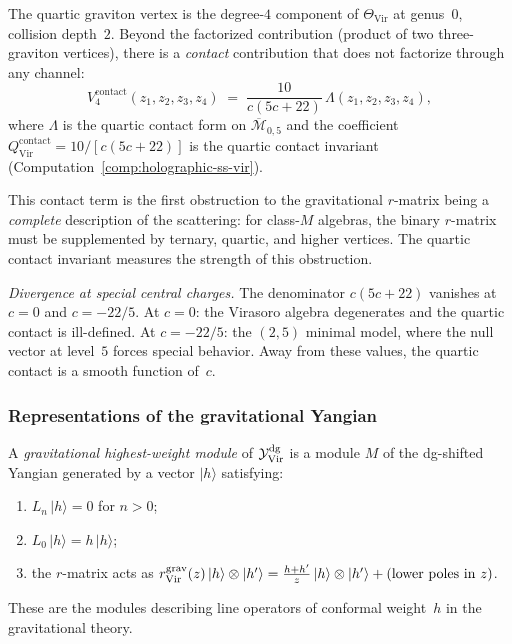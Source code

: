 \begin{computation}
\label{comp:thqg-V-quartic-graviton}
The quartic graviton vertex is the degree-$4$ component of
$\Theta_{\mathrm{Vir}}$ at genus~$0$, collision depth~$2$.
Beyond the factorized contribution
(product of two three-graviton vertices), there is a
\emph{contact} contribution that does not factorize through
any channel:
\begin{equation}\label{eq:thqg-V-quartic-contact}
V_4^{\mathrm{contact}}(z_1, z_2, z_3, z_4)
\;=\;
\frac{10}{c(5c+22)}\,
\Lambda(z_1, z_2, z_3, z_4),
\end{equation}
where $\Lambda$ is the quartic contact form on
$\overline{\mathcal{M}}_{0,5}$ and the coefficient
$Q^{\mathrm{contact}}_{\mathrm{Vir}} = 10/[c(5c+22)]$ is the
quartic contact invariant
(Computation~\ref{comp:holographic-ss-vir}).

This contact term is the first obstruction to the gravitational
$r$-matrix being a \emph{complete} description of the scattering:
for class-$M$ algebras, the binary $r$-matrix must be supplemented
by ternary, quartic, and higher vertices. The quartic contact
invariant measures the strength of this obstruction.

\emph{Divergence at special central charges.}
The denominator $c(5c+22)$ vanishes at $c = 0$ and
$c = -22/5$. At $c = 0$: the Virasoro algebra degenerates and the
quartic contact is ill-defined. At $c = -22/5$:
the $(2,5)$ minimal model, where the null vector at level~$5$ forces
special behavior. Away from these values, the quartic contact is a
smooth function of~$c$.
\end{computation}


\subsubsection{Representations of the gravitational Yangian}

\begin{definition}
\label{def:thqg-V-gravitational-hw}
A \emph{gravitational highest-weight module} of $\mathcal{Y}^{\mathrm{dg}}_{\mathrm{Vir}}$
is a module $M$ of the dg-shifted Yangian generated by a vector
$|h\rangle$ satisfying:
\begin{enumerate}[label=\textup{(\roman*)}]
\item $L_n\,|h\rangle = 0$ for $n > 0$;
\item $L_0\,|h\rangle = h\,|h\rangle$;
\item the $r$-matrix acts as
 $r^{\mathrm{grav}}_{\mathrm{Vir}}(z)\,|h\rangle \otimes |h'\rangle
 = \frac{h + h'}{z}\,|h\rangle \otimes |h'\rangle
 + (\text{lower poles in }z)$.
\end{enumerate}
These are the modules describing line operators of conformal
weight~$h$ in the gravitational theory.
\end{definition}


